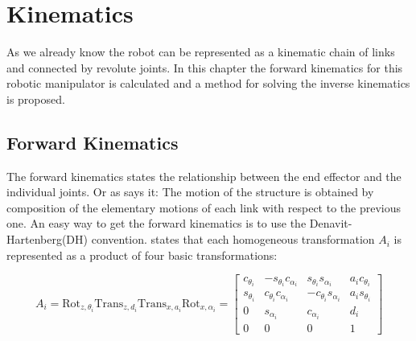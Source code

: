 \chapter{Kinematics}
As we already know the robot can be represented as a kinematic chain of links and connected by revolute joints. In this chapter the forward kinematics for this robotic manipulator is calculated and a method for solving the inverse kinematics is proposed. 

\section{Forward Kinematics}
The forward kinematics states the relationship between the end effector and the individual joints. Or as \cite{Siciliano} says it: The motion of the structure is obtained by composition of the elementary motions of each link with respect to the previous one. An easy way to get the forward kinematics is to use the Denavit-Hartenberg(DH) convention. \cite{spong} states that each homogeneous transformation $A_i$ is represented as a product of four basic transformations: 

$$
A_i = \text{Rot}_{z,\theta_i}\text{Trans}_{z,d_i}\text{Trans}_{x,a_i}\text{Rot}_{x,\alpha_i}=
    \begin{bmatrix}
        c_{\theta_i} & -s_{\theta_i}c_{\alpha_i} & s_{\theta_i}s_{\alpha_i} & a_ic_{\theta_i}\\
        s_{\theta_i} & c_{\theta_i}c_{\alpha_i} & -c_{\theta_i}s_{\alpha_i} & a_is_{\theta_i}\\
        0 & s_{\alpha_i} & c_{\alpha_i} &d_i\\
        0 & 0 & 0 & 1
    \end{bmatrix}
$$

